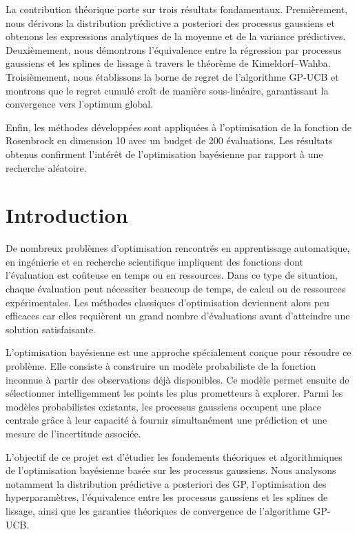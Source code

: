 \documentclass[12pt]{article}
\begin{document}
La contribution théorique porte sur trois résultats fondamentaux. Premièrement,
nous dérivons la distribution prédictive a posteriori des processus gaussiens et
obtenons les expressions analytiques de la moyenne et de la variance prédictives.
Deuxièmement, nous démontrons l'équivalence entre la régression par processus
gaussiens et les splines de lissage à travers le théorème de Kimeldorf--Wahba.
Troisièmement, nous établissons la borne de regret de l'algorithme GP-UCB et
montrons que le regret cumulé croît de manière sous-linéaire, garantissant la
convergence vers l'optimum global.

Enfin, les méthodes développées sont appliquées à l'optimisation de la fonction
de Rosenbrock en dimension 10 avec un budget de 200 évaluations. Les résultats
obtenus confirment l'intérêt de l'optimisation bayésienne par rapport à une
recherche aléatoire.

\section*{Introduction}

De nombreux problèmes d'optimisation rencontrés en apprentissage automatique, en
ingénierie et en recherche scientifique impliquent des fonctions dont
l'évaluation est coûteuse en temps ou en ressources. Dans ce type de situation,
chaque évaluation peut nécessiter beaucoup de temps, de calcul ou de ressources
expérimentales. Les méthodes classiques d'optimisation deviennent alors peu
efficaces car elles requièrent un grand nombre d'évaluations avant d'atteindre une
solution satisfaisante.

L'optimisation bayésienne est une approche spécialement conçue pour résoudre ce
problème. Elle consiste à construire un modèle probabiliste de la fonction
inconnue à partir des observations déjà disponibles. Ce modèle permet ensuite de
sélectionner intelligemment les points les plus prometteurs à explorer. Parmi les
modèles probabilistes existants, les processus gaussiens occupent une place
centrale grâce à leur capacité à fournir simultanément une prédiction et une
mesure de l'incertitude associée.

L'objectif de ce projet est d'étudier les fondements théoriques et algorithmiques
de l'optimisation bayésienne basée sur les processus gaussiens. Nous analysons
notamment la distribution prédictive a posteriori des GP, l'optimisation des
hyperparamètres, l'équivalence entre les processus gaussiens et les splines de
lissage, ainsi que les garanties théoriques de convergence de l'algorithme
GP-UCB.
\end{document}

